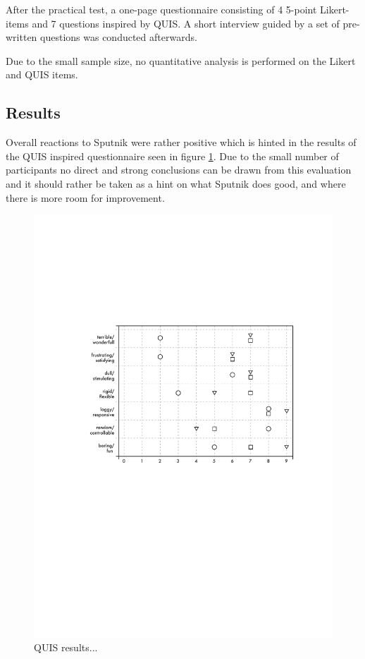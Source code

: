\documentclass[10pt,a4paper]{scrartcl}
\begin{document}
After the practical test, a one-page questionnaire consisting of 4 5-point Likert-items and 7 questions inspired by QUIS\cite{Chin1988}. A short interview guided by a set of pre-written questions was conducted afterwards.

Due to the small sample size, no quantitative analysis is performed on the Likert and QUIS items. 

\subsection{Results}
Overall reactions to Sputnik were rather positive which is hinted in the results of the QUIS inspired questionnaire seen in figure \ref{fig:QUIS}. Due to the small number of participants no direct and strong conclusions can be drawn from this evaluation and it should rather be taken as a hint on what Sputnik does good, and where there is more room for improvement.

\begin{figure}[hbtp]
\begin{center}
\includegraphics[width = 0.8 \columnwidth]{img/stripchart}
\caption{QUIS results...}
\label{fig:QUIS}
\end{center}
\end{figure}
\end{document}

